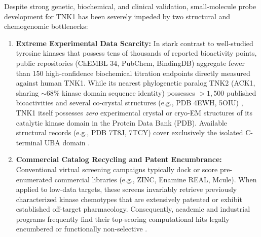 \documentclass[journal]{IEEEtran}
\begin{document}
Despite strong genetic, biochemical, and clinical validation, small-molecule probe development for TNK1 has been severely impeded by two structural and chemogenomic bottlenecks:
\begin{enumerate}
    \item \textbf{Extreme Experimental Data Scarcity:} In stark contrast to well-studied tyrosine kinases that possess tens of thousands of reported bioactivity points, public repositories (ChEMBL 34, PubChem, BindingDB) aggregate fewer than 150 high-confidence biochemical titration endpoints directly measured against human TNK1. While its nearest phylogenetic paralog TNK2 (ACK1, sharing $\sim 68\%$ kinase domain sequence identity) possesses $>1,500$ published bioactivities and several co-crystal structures (e.g., PDB 4EWH, 5OIU) \cite{mahajan2005ack1, ack1_pdb}, TNK1 itself possesses \textit{zero} experimental crystal or cryo-EM structures of its catalytic kinase domain in the Protein Data Bank (PDB). Available structural records (e.g., PDB 7T8J, 7TCY) cover exclusively the isolated C-terminal UBA domain \cite{bateman2022tnk1}.
    \item \textbf{Commercial Catalog Recycling and Patent Encumbrance:} Conventional virtual screening campaigns typically dock or score pre-enumerated commercial libraries (e.g., ZINC, Enamine REAL, Mcule). When applied to low-data targets, these screens invariably retrieve previously characterized kinase chemotypes that are extensively patented or exhibit established off-target pharmacology. Consequently, academic and industrial programs frequently find their top-scoring computational hits legally encumbered or functionally non-selective \cite{walters2020going}.
\end{enumerate}
\end{document}
